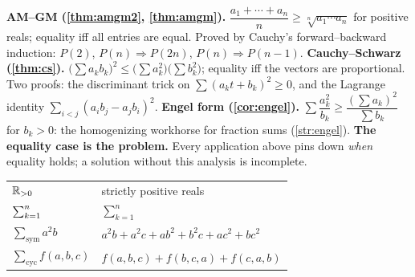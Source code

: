 \begin{chaptersummary}
\begin{itemize}
  \summaryitem \textbf{AM--GM (\cref{thm:amgm2}, \cref{thm:amgm}).}
    $\dfrac{a_1 + \cdots + a_n}{n} \ge \sqrt[n]{a_1 \cdots a_n}$ for
    positive reals; equality iff all entries are equal. Proved by
    Cauchy's forward--backward induction: $P(2)$, $P(n) \Rightarrow
    P(2n)$, $P(n) \Rightarrow P(n{-}1)$.
  \summaryitem \textbf{Cauchy--Schwarz (\cref{thm:cs}).}
    $\big(\sum a_kb_k\big)^2 \le \big(\sum a_k^2\big)\big(\sum
    b_k^2\big)$; equality iff the vectors are proportional. Two
    proofs: the discriminant trick on $\sum (a_kt + b_k)^2 \ge 0$,
    and the Lagrange identity
    $\sum_{i<j}(a_ib_j - a_jb_i)^2$.
  \summaryitem \textbf{Engel form (\cref{cor:engel}).}
    $\sum \dfrac{a_k^2}{b_k} \ge \dfrac{(\sum a_k)^2}{\sum b_k}$ for
    $b_k > 0$: the homogenizing workhorse for fraction sums
    (\cref{str:engel}).
  \summaryitem \textbf{The equality case is the problem.} Every
    application above pins down \emph{when} equality holds; a
    solution without this analysis is incomplete.
\end{itemize}
\end{chaptersummary}

\begin{notation}
\begin{tabular}{@{}ll@{}}
  $\mathbb{R}_{>0}$ & strictly positive reals \\
  $\sum_{k=1}^{n}$ & $\sum_{k=1}^{n}$ \\
  $\sum_{\text{sym}} a^2b$ & $a^2b + a^2c + ab^2 + b^2c + ac^2 + bc^2$ \\
  $\sum_{\text{cyc}} f(a,b,c)$ & $f(a,b,c) + f(b,c,a) + f(c,a,b)$ \\
\end{tabular}
\end{notation}
